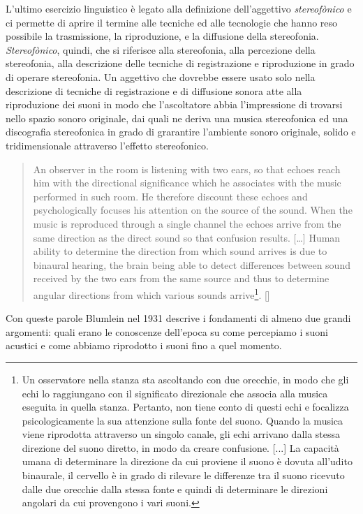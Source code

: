 L'ultimo esercizio linguistico è legato alla definizione dell'aggettivo
\emph{stereofònico} e ci permette di aprire il termine alle tecniche ed alle
tecnologie che hanno reso possibile la trasmissione, la riproduzione,
e la diffusione della stereofonia. \emph{Stereofònico}, quindi, che si riferisce
alla stereofonia, alla percezione della stereofonia, alla descrizione delle
tecniche di registrazione e riproduzione in grado di operare stereofonia. Un
aggettivo che dovrebbe essere usato solo nella
descrizione di tecniche di registrazione e di diffusione sonora atte alla
riproduzione dei suoni in modo che l’ascoltatore abbia l’impressione di trovarsi
nello spazio sonoro originale, dai quali ne deriva una musica stereofonica ed
una discografia stereofonica in grado di grarantire l’ambiente sonoro originale,
solido e tridimensionale attraverso l’effetto stereofonico.

\begin{quotation}
An observer in the room is listening with two ears, so that echoes reach him
with the directional significance which he associates with the music performed
in such room. He therefore discount these echoes and psychologically focuses
his attention on the source of the sound. When the music is reproduced through
a single channel the echoes arrive from the same direction as the direct sound
so that confusion results. [\ldots] Human ability to determine the direction
from which sound arrives is due to binaural hearing, the brain being able to
detect differences between sound received by the two ears from the same source
and thus to determine angular directions from which various sounds
arrive\footnote{Un osservatore nella stanza sta ascoltando con due orecchie, in
modo che gli echi lo raggiungano con il significato direzionale che associa alla
musica eseguita in quella stanza. Pertanto, non tiene conto di questi echi e
focalizza psicologicamente la sua attenzione sulla fonte del suono. Quando la
musica viene riprodotta attraverso un singolo canale, gli echi arrivano dalla
stessa direzione del suono diretto, in modo da creare confusione. [...] La
capacità umana di determinare la direzione da cui proviene il suono è dovuta
all'udito binaurale, il cervello è in grado di rilevare le differenze tra il
suono ricevuto dalle due orecchie dalla stessa fonte e quindi di determinare le
direzioni angolari da cui provengono i vari suoni.}. [\cite{ab58}]
\end{quotation}

Con queste parole Blumlein nel 1931 descrive i fondamenti di almeno due grandi
argomenti: quali erano le conoscenze  dell'epoca su come percepiamo i suoni
acustici e come abbiamo riprodotto i suoni fino a quel momento.

